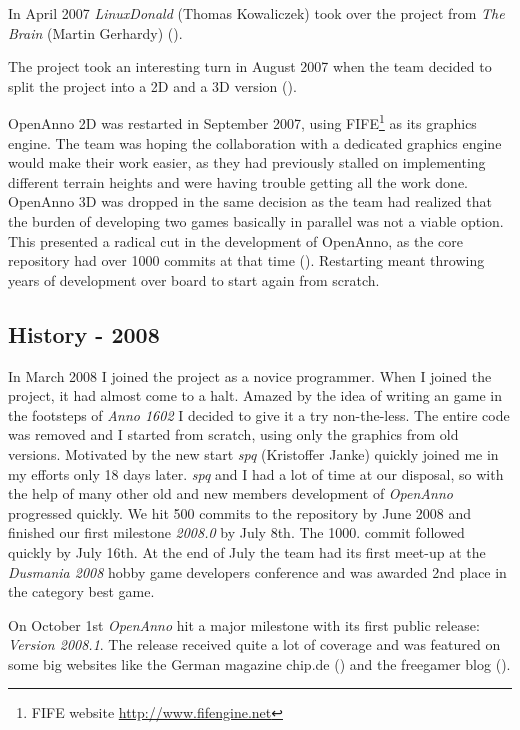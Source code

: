 In April 2007 \textit{LinuxDonald} (Thomas Kowaliczek) took over the project from
\textit{The Brain} (Martin Gerhardy) (\cite{ld1}).

The project took an interesting turn in August 2007 when the team decided to
split the project into a 2D and a 3D version (\cite{ld2}).

OpenAnno 2D was restarted in September 2007, using FIFE\footnote{FIFE
website \url{http://www.fifengine.net}} as its graphics engine. The team was hoping the collaboration with a dedicated
graphics engine would make their work easier, as they had previously stalled on implementing different terrain heights
and were having trouble getting all the work done. OpenAnno 3D was dropped in the same decision as the team had
realized that the burden of developing two games basically in parallel was not a viable option. This presented a radical
cut in the development of OpenAnno, as the core repository had over 1000 commits at that time (\cite{ld3}). Restarting meant throwing years of development over board
to start again from scratch.

\subsection{History - 2008}
In March 2008 I joined the project as a novice programmer. When I joined the project, it had almost come to a halt. Amazed
by the idea of writing an \OS{} game in the footsteps of \textit{Anno 1602} I decided to give it a try non-the-less. The
entire code was removed and I started from scratch, using only the graphics from old versions. Motivated by the new start
\textit{spq} (Kristoffer Janke) quickly joined me in my efforts only 18 days later. \textit{spq} and I had a lot of time at our disposal, so with
the help of many other old and new members development of \textit{OpenAnno} progressed quickly. We hit 500 commits to the repository
by June 2008 and finished our first milestone \textit{2008.0} by July 8th. The 1000. commit followed quickly by July 16th. At the
end of July the team had its first meet-up at the \textit{Dusmania 2008} hobby game developers conference and was awarded
2nd place in the category best game.

On October 1st \textit{OpenAnno} hit a major milestone with its first public release: \textit{Version 2008.1}. The release
received quite a lot of coverage and was featured on some big websites like the German magazine chip.de (\cite{chipde08})
and the freegamer blog (\cite{freegamer}).

